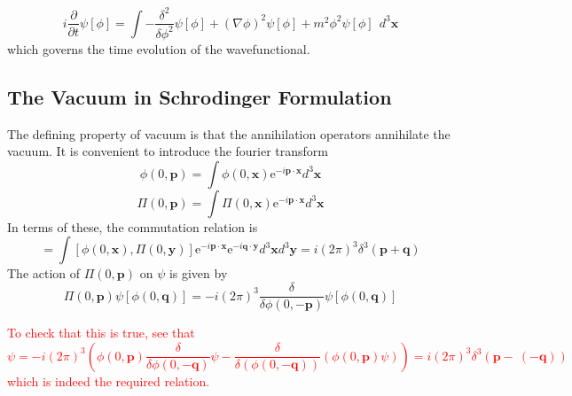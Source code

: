 \documentclass[11pt]{article}
\newcommand{\del}{\partial}
\newcommand{\e}{\mathrm{e}}
\numberwithin{equation}{section}
\begin{document}
    \begin{equation}
        i\frac{\del}{\del t}\psi[\phi] = \int -\frac{\delta^2}{\delta \phi^2} \psi[\phi] + (\nabla \phi)^2\psi[\phi]+ m^2\phi^2\psi[\phi]  ~~d^3\textbf{x}
    \end{equation}
    which governs the time evolution of the wavefunctional.

    \subsection{The Vacuum in Schrodinger Formulation}
    The defining property of vacuum is that the annihilation operators annihilate the vacuum. 
    It is convenient to introduce the fourier transform 
    \begin{equation}
        \phi(0, \textbf{p}) = \int \phi(0, \textbf{x}) \e^{-i\textbf{p}\cdot \textbf{x}}d^3\textbf{x}
    \end{equation}
    \begin{equation}
        \Pi(0, \textbf{p}) = \int \Pi(0, \textbf{x}) \e^{-i\textbf{p}\cdot \textbf{x}}d^3\textbf{x}
    \end{equation}
    In terms of these, the commutation relation is 
    \begin{equation}
        [\phi(0, \textbf{p}), \Pi(0, \textbf{q})] = \int [\phi(0, \textbf{x}), \Pi(0, \textbf{y})]\e^{-i\textbf{p}\cdot\textbf{x}}\e^{-i\textbf{q}\cdot \textbf{y}} d^3\textbf{x}d^3\textbf{y} = i(2\pi)^3\delta^3(\textbf{p}+\textbf{q})
    \end{equation}
    The action of \(\Pi(0, \textbf{p})\) on \(\psi\) is given by 
    \begin{equation}
        \Pi(0, \textbf{p})\psi[\phi(0, \textbf{q})] = -i(2\pi)^3\frac{\delta}{\delta \phi(0, -\textbf{p})}\psi[\phi(0, \textbf{q})]
    \end{equation}

    \textcolor{red}{
        To check that this is true, see that
        \begin{equation}
            [\psi(0, \textbf{p}), \Pi(0, \textbf{q})]\psi = -i(2\pi)^3 \left( \phi(0, \textbf{p}) \frac{\delta}{\delta \phi(0,-\textbf{q})}\psi - \frac{\delta}{\delta(\phi(0, -\textbf{q}))} (\phi(0, \textbf{p})\psi)\right) = i(2\pi)^3\delta^3(\textbf{p}-~(-\textbf{q}))
        \end{equation}
        which is indeed the required relation.\\
    }
\end{document}

